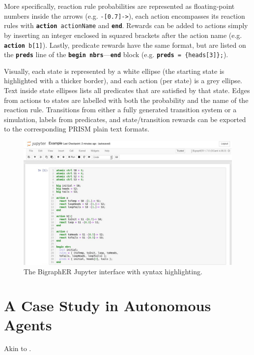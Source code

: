 \documentclass[runningheads]{llncs}
\begin{document}
More specifically, reaction rule probabilities are represented as floating-point
numbers inside the arrows (e.g. \texttt{-[0.7]->}), each action encompasses its
reaction rules with \texttt{\textbf{action} actionName} and
\texttt{\textbf{end}}. Rewards can be added to actions simply by inserting an
integer enclosed in squared brackets after the action name (e.g.
\texttt{\textbf{action} b[1]}). Lastly, predicate rewards have the same format,
but are listed on the \texttt{\textbf{preds}} line of the \texttt{\textbf{begin
    nbrs}}---\texttt{\textbf{end}} block (e.g. \texttt{\textbf{preds} =
  \{heads[3]\};}).

Visually, each state is represented by a white ellipse (the starting state is
highlighted with a thicker border), and each action (per state) is a grey
ellipse. Text inside state ellipses lists all predicates that are satisfied by
that state. Edges from actions to states are labelled with both the probability
and the name of the reaction rule. Transitions from either a fully generated
transition system or a simulation, labels from predicates, and state/transition
rewards can be exported to the corresponding PRISM plain text formats.

\begin{figure}
  \includegraphics{images/interface.jpg}
  \caption{The BigraphER Jupyter interface with syntax highlighting.}
  \label{interface}
\end{figure}

\section{A Case Study in Autonomous Agents}

Akin to \cite{dblp:conf/nfm/giaquintahimn18}.
\end{document}
